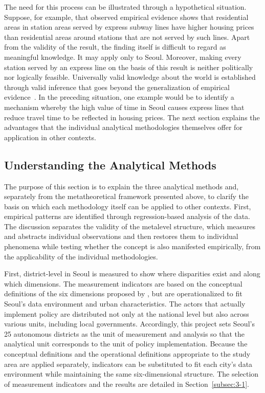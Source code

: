 The need for this process can be illustrated through a hypothetical situation. Suppose, for example, that observed empirical evidence shows that residential areas in station areas served by express subway lines have higher housing prices than residential areas around stations that are not served by such lines. Apart from the validity of the result, the finding itself is difficult to regard as meaningful knowledge. It may apply only to Seoul. Moreover, making every station served by an express line on the basis of this result is neither politically nor logically feasible. Universally valid knowledge about the world is established through valid inference that goes beyond the generalization of empirical evidence~\citep{Bhaskar1975}. In the preceding situation, one example would be to identify a mechanism whereby the high value of time in Seoul causes express lines that reduce travel time to be reflected in housing prices. The next section explains the advantages that the individual analytical methodologies themselves offer for application in other contexts.

\subsection{Understanding the Analytical Methods}
\label{subsec:1-2}

The purpose of this section is to explain the three analytical methods and, separately from the metatheoretical framework presented above, to clarify the basis on which each methodology itself can be applied to other contexts. First, empirical patterns are identified through regression-based analysis of the data. The discussion separates the validity of the metalevel structure, which measures and abstracts individual observations and then restores them to individual phenomena while testing whether the \umc{} concept is also manifested empirically, from the applicability of the individual methodologies.

First, district-level \umc{} in Seoul is measured to show where disparities exist and along which dimensions. The measurement indicators are based on the conceptual definitions of the six dimensions proposed by \citet{ITU2023}, but are operationalized to fit Seoul's data environment and urban characteristics. The actors that actually implement policy are distributed not only at the national level but also across various units, including local governments. Accordingly, this project sets Seoul's 25 autonomous districts as the unit of measurement and analysis so that the analytical unit corresponds to the unit of policy implementation. Because the conceptual definitions and the operational definitions appropriate to the study area are applied separately, indicators can be substituted to fit each city's data environment while maintaining the same six-dimensional structure. The selection of measurement indicators and the results are detailed in Section~\ref{subsec:3-1}.

